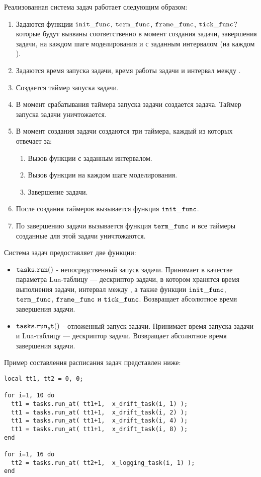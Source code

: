 Реализованная система задач работает следующим образом:
\begin{enumerate}
	\item 	Задаются функции $\tt init\_func$, $\tt term\_func$, $\tt frame\_func$, 
			$\tt tick\_func$? которые будут вызваны соответственно в момент создания задачи, 
			завершения задачи, на каждом шаге моделирования и с заданным интервалом 
			(на каждом ).
	\item	Задаются время запуска задачи, время работы задачи и интервал между .
	\item 	Создается таймер запуска задачи.
	\item 	В момент срабатывания таймера запуска задачи создается задача. 
			Таймер запуска задачи уничтожается.
	\item 	В момент создания задачи создаются три таймера, каждый из которых отвечает за:
	\begin{enumerate}
		\item	Вызов функции с заданным интервалом.
		\item	Вызов функции на каждом шаге моделирования.
		\item	Завершение задачи.
	\end{enumerate}	 
	\item 	После создания таймеров вызывается функция $\tt init\_func$.
	\item	По завершению задачи вызывается функция $\tt term\_func$ и все 
			таймеры созданные для этой задачи уничтожаются.
\end{enumerate}

Система задач предоставляет две функции:
\begin{itemize}
	\item	$\tt tasks.run()$ - непосредственный запуск задачи. 
			Принимает в качестве параметра Lua-таблицу --- 
			дескриптор задачи, в котором хранятся время выполнения задачи, 
			интервал между , а также функции 
			$\tt init\_func$, $\tt term\_func$, $\tt frame\_func$ 
			и $\tt tick\_func$. Возвращает абсолютное время завершения задачи.
	\item	$\tt tasks.run_at()$ - отложенный запуск задачи. 	
			Принимает время запуска задачи и Lua-таблицу --- дескриптор задачи. 
			Возвращает абсолютное время завершения задачи.
\end{itemize}

Пример составления расписания задач представлен ниже:

\begin{lstlisting}[caption={Пример создания расписания задач}]
local tt1, tt2 = 0, 0;

for i=1, 10 do
  tt1 = tasks.run_at( tt1+1,  x_drift_task(i, 1) );
  tt1 = tasks.run_at( tt1+1,  x_drift_task(i, 2) );
  tt1 = tasks.run_at( tt1+1,  x_drift_task(i, 4) );
  tt1 = tasks.run_at( tt1+1,  x_drift_task(i, 8) );
end

for i=1, 16 do
  tt2 = tasks.run_at( tt2+1,  x_logging_task(i, 1) );
end
\end{lstlisting}


